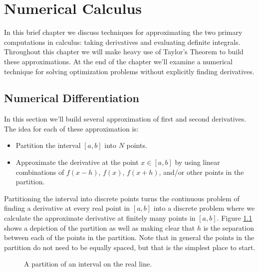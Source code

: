 \chapter{Numerical Calculus}
In this brief chapter we discuss techniques for approximating the two primary computations
in calculus: taking derivatives and evaluating definite integrals. Throughout this chapter
we will make heavy use of Taylor's Theorem to build these approximations. At the end of
the chapter we'll examine a numerical technique for solving optimization problems without
explicitly finding derivatives.  


\section{Numerical Differentiation}
In this section we'll build several approximation of first and second derivatives.  The
idea for each of these approximation is:
\begin{itemize}
    \item Partition the interval $[a,b]$ into $N$ points.
    \item Approximate the derivative at the point $x \in [a,b]$ by using linear
        combinations of $f(x-h)$, $f(x)$, $f(x+h)$, and/or other points in the partition.  
\end{itemize}
Partitioning the interval into discrete points turns the continuous problem of finding a
derivative at every real point in $[a,b]$ into a discrete
problem where we calculate the approximate derivative at finitely many points in $[a,b]$.
Figure \ref{fig:differentiation_partition} shows a depiction of the partition as well as
making clear that $h$ is the separation between each of the points in the partition.  Note
that in general the points in the partition do not need to be equally spaced, but that is
the simplest place to start.
\begin{figure}[ht!]
    \begin{center}
    \end{center}
    \caption{A partition of an interval on the real line.}
    \label{fig:differentiation_partition}
\end{figure}


